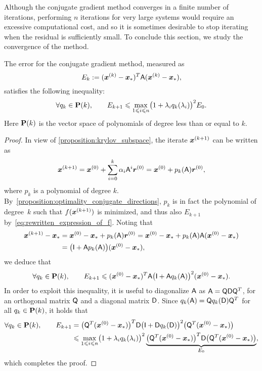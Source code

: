 Although the conjugate gradient method converges in a finite number of iterations,
performing $n$ iterations for very large systems  would require an excessive computational cost,
and so it is sometimes desirable to stop iterating when the residual is sufficiently small.
To conclude this section, we study the convergence of the method.
\begin{theorem}
    \label{theorem:convergence_conjugate_gradient}
    The error for the conjugate gradient method,
    measured as 
    \[
        E_{k} := (\mathbf{\boldsymbol{x}}^{(k)} - \mathbf{\boldsymbol{x}}_*)^T  \mathsf A (\mathbf{\boldsymbol{x}}^{(k)} - \mathbf{\boldsymbol{x}}_*),
    \]
    satisfies the following inequality:
    \begin{equation}
        \label{equation:convergence_conjugate_gradient}
        \forall q_k \in \mathbf P(k), \qquad
        E_{k+1} \leqslant  \max_{1\leqslant i \leqslant n}\bigl(1 + \lambda_i q_k(\lambda_i) \bigr)^2   E_0.
    \end{equation}
    Here $\mathbf P(k)$ is the vector space of polynomials of degree less than or equal to $k$.
\end{theorem}
\begin{proof}

In view of \cref{proposition:krylov_subspace},
the iterate $\mathbf{\boldsymbol{x}}^{(k+1)}$ can be written as
\[
    \mathbf{\boldsymbol{x}}^{(k+1)} = \mathbf{\boldsymbol{x}}^{(0)} + \sum_{i=0}^{k} \alpha_i \mathsf A^i \mathbf{\boldsymbol{r}}^{(0)}
    = \mathbf{\boldsymbol{x}}^{(0)} + p_k(\mathsf A) \mathbf{\boldsymbol{r}}^{(0)},
\]
where $p_k$ is a polynomial of degree $k$.
By~\cref{proposition:optimality_conjugate_directions},
$p_k$ is in fact the polynomial of degree~$k$ such that $f(\mathbf{\boldsymbol{x}}^{(k+1)})$ is minimized,
and thus also $E_{k+1}$ by~\eqref{eq:rewritten_expression_of_f}.
Noting that
\begin{align*}
    \mathbf{\boldsymbol{x}}^{(k+1)} - \mathbf{\boldsymbol{x}}_*
    &= \mathbf{\boldsymbol{x}}^{(0)}  - \mathbf{\boldsymbol{x}}_* + p_k(\mathsf A) \mathbf{\boldsymbol{r}}^{(0)}
    = \mathbf{\boldsymbol{x}}^{(0)}  - \mathbf{\boldsymbol{x}}_* + p_k(\mathsf A) \mathsf A (\mathbf{\boldsymbol{x}}^{(0)} - \mathbf{\boldsymbol{x}}_*) \\
    &= \bigl(\mathsf I + \mathsf A p_k(\mathsf A) \bigr) (\mathbf{\boldsymbol{x}}^{(0)} - \mathbf{\boldsymbol{x}}_*),
\end{align*}
we deduce that
\[
    \forall q_k \in \mathbf P(k), \qquad
    E_{k+1} \leqslant (\mathbf{\boldsymbol{x}}^{(0)} - \mathbf{\boldsymbol{x}}_*)^T \mathsf A \bigl(\mathsf I + \mathsf A q_k(\mathsf A) \bigr)^2  (\mathbf{\boldsymbol{x}}^{(0)} - \mathbf{\boldsymbol{x}}_*).
\]
In order to exploit this inequality,
it is useful to diagonalize $\mathsf A$ as $\mathsf A = \mathsf Q \mathsf D \mathsf Q^T$,
for an orthogonal matrix $\mathsf Q$ and a diagonal matrix $\mathsf D$.
Since $q_k(\mathsf A) = \mathsf Q q_k(\mathsf D) \mathsf Q^T$ for all $q_k \in \mathbf P(k)$,
it holds that
\begin{align*}
    \forall q_k \in \mathbf P(k), \qquad
    E_{k+1}
    &= \bigl(\mathsf Q^T (\mathbf{\boldsymbol{x}}^{(0)} - \mathbf{\boldsymbol{x}}_*)\bigr)^T \mathsf D \bigl(\mathsf I + \mathsf D q_k(\mathsf D) \bigr)^2  \bigl(\mathsf Q^T (\mathbf{\boldsymbol{x}}^{(0)} - \mathbf{\boldsymbol{x}}_*)\bigr) \\
    &\leqslant  \max_{1\leqslant i \leqslant n}\bigl(1 + \lambda_i q_k(\lambda_i) \bigr)^2   \underbrace{\bigl(\mathsf Q^T (\mathbf{\boldsymbol{x}}^{(0)} - \mathbf{\boldsymbol{x}}_*)\bigr)^T \mathsf D   \bigl(\mathsf Q^T (\mathbf{\boldsymbol{x}}^{(0)} - \mathbf{\boldsymbol{x}}_*)\bigr)}_{E_0},
\end{align*}
which completes the proof.
\end{proof}

